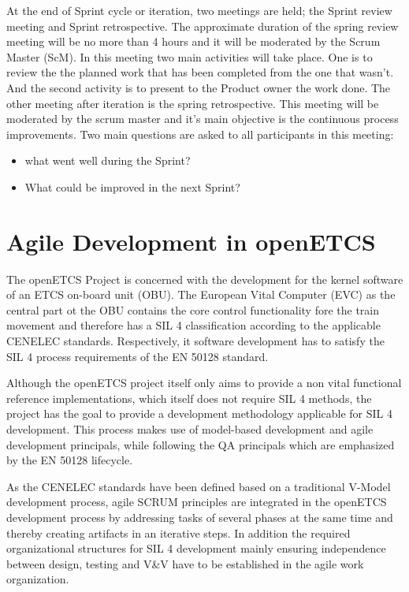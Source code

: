 At the end of Sprint cycle or iteration, two meetings are held; the Sprint review meeting and Sprint retrospective. The approximate duration of the spring review meeting will be no more than 4 hours and it will be moderated by the Scrum Master (ScM). In this meeting two main activities will take place. One is to review the the planned work that has been completed from the one that wasn't. And the second activity is to present to the Product owner the work done. The other meeting after iteration is the spring retrospective. This meeting will be moderated by the scrum master and it's main objective is the continuous process improvements. Two main questions are asked to all participants in this meeting:
\begin{itemize}
\item   what went well during the Sprint? 
\item What could be improved in the next Sprint?
\end{itemize}


\chapter{Agile Development in openETCS}
\label{sec:agile}

The openETCS Project is concerned with the development for the kernel software of an ETCS on-board unit (OBU). The European Vital Computer (EVC) as the central part ot the OBU contains the core control functionality fore the train movement and therefore has a SIL 4 classification according to the applicable CENELEC standards. Respectively, it software development has to satisfy the SIL 4 process requirements of the EN 50128 standard. 

Although the openETCS project itself only aims to provide a non vital functional reference implementations, which itself does not require SIL 4 methods, the project has the goal to provide a development methodology applicable for SIL 4 development. This process makes use of model-based development and agile development principals, while following the QA principals which are emphasized by the EN 50128 lifecycle. 

As the CENELEC standards have been defined based on a traditional V-Model development process, agile SCRUM principles are integrated in the openETCS development process by addressing tasks of several phases at the same time and thereby creating artifacts in an iterative steps. In addition the required organizational structures for SIL 4 development mainly ensuring independence between design, testing and V\&V have to be established in the agile work organization.

